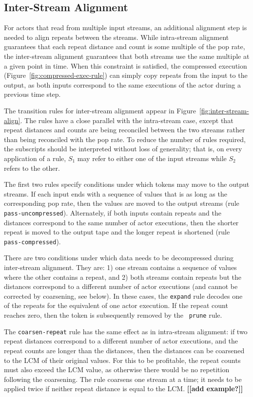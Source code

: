 \subsection{Inter-Stream Alignment}

For actors that read from multiple input streams, an additional
alignment step is needed to align repeats between the streams.  While
intra-stream alignment guarantees that each repeat distance and count
is some multiple of the pop rate, the inter-stream alignment
guarantees that both streams use the same multiple at a given point in
time.  When this constraint is satisfied, the compressed execution
(Figure~\ref{fig:compressed-exec-rule}) can simply copy repeats from
the input to the output, as both inputs correspond to the same
executions of the actor during a previous time step.

The transition rules for inter-stream alignment appear in
Figure~\ref{fig:inter-stream-align}.  The rules have a close parallel
with the intra-stream case, except that repeat distances and counts
are being reconciled between the two streams rather than being
reconciled with the pop rate.  To reduce the number of rules required,
the subscripts should be interpreted without loss of generality; that
is, on every application of a rule, $S_1$ may refer to either one of
the input streams while $S_2$ refers to the other.

The first two rules specify conditions under which tokens may move to
the output streams.  If each input ends with a sequence of values that
is as long as the corresponding pop rate, then the values are moved to
the output streams (rule {\tt pass-uncompressed}).  Alternately, if
both inputs contain repeats and the distances correspond to the same
number of actor executions, then the shorter repeat is moved to the
output tape and the longer repeat is shortened (rule {\tt
pass-compressed}).

There are two conditions under which data needs to be decompressed
during inter-stream alignment.  They are: 1) one stream contains a
sequence of values where the other contains a repeat, and 2) both
streams contain repeats but the distances correspond to a different
number of actor executions (and cannot be corrected by coarsening, see
below).  In these cases, the {\tt expand} rule decodes one of the
repeats for the equivalent of one actor execution.  If the repeat
count reaches zero, then the token is subsequently removed by the {\tt
prune} rule.

The {\tt coarsen-repeat} rule has the same effect as in intra-stream
alignment: if two repeat distances correspond to a different number of
actor executions, and the repeat counts are longer than the distances,
then the distances can be coarsened to the LCM of their original
values.  For this to be profitable, the repeat counts must also exceed
the LCM value, as otherwise there would be no repetition following the
coarsening.  The rule coarsens one stream at a time; it needs to be
applied twice if neither repeat distance is equal to the LCM. {\bf
[[add example?]]}

